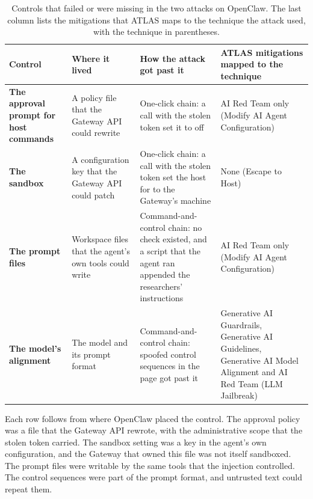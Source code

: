 \begin{table}[tb]
  \caption{Controls that failed or were missing in the two attacks on OpenClaw. The last column lists
  the mitigations that ATLAS maps to the technique the attack used, with the technique in
  parentheses.}
  \label{tab:openclaw-controls}
  \begin{adjustbox}{width=\textwidth}\begin{tabularx}{\textwidth}{L{0.15\textwidth}L{0.21\textwidth}XL{0.28\textwidth}}
    \toprule
    \textbf{Control} & \textbf{Where it lived} & \textbf{How the attack got past it} &
    \textbf{ATLAS mitigations mapped to the technique} \\
    \midrule
    \textbf{The approval prompt for host commands} & A policy file that the Gateway API could
    rewrite & One-click chain: a call with the stolen token set it to off & AI Red Team only (Modify
    AI Agent Configuration) \\
    \midrule
    \textbf{The sandbox} & A configuration key that the Gateway API could patch & One-click chain: a
    call with the stolen token set the host for  to the Gateway's machine & None
    (Escape to Host) \\
    \midrule
    \textbf{The prompt files} & Workspace files that the agent's own tools could write &
    Command-and-control chain: no check existed, and a script that the agent ran appended the
    researchers' instructions & AI Red Team only (Modify AI Agent Configuration) \\
    \midrule
    \textbf{The model's alignment} & The model and its prompt format & Command-and-control chain:
    spoofed control sequences in the page got past it & Generative AI Guardrails, Generative AI
    Guidelines, Generative AI Model Alignment and AI Red Team (LLM Jailbreak) \\
    \bottomrule
  \end{tabularx}\end{adjustbox}
\end{table}

Each row follows from where OpenClaw placed the control. The approval policy was a
file that the Gateway API rewrote, with the administrative scope that the stolen token carried. The
sandbox setting was a key in the agent's own configuration, and the Gateway that owned this file was
not itself sandboxed. The prompt files were writable by the same tools that the injection controlled.
The control sequences were part of the prompt format, and untrusted text could repeat them.

